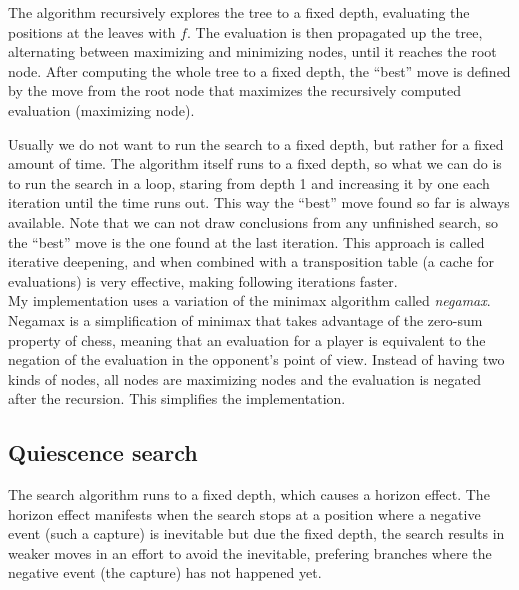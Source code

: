 The algorithm recursively explores the tree to a fixed depth, evaluating the positions at the leaves with $f$. The evaluation is then propagated up the tree, alternating between maximizing and minimizing nodes, until it reaches the root node. After computing the whole tree to a fixed depth, the \enquote{best} move is defined by the move from the root node that maximizes the recursively computed evaluation (maximizing node).

Usually we do not want to run the search to a fixed depth, but rather for a fixed amount of time. The algorithm itself runs to a fixed depth, so what we can do is to run the search in a loop, staring from depth 1 and increasing it by one each iteration until the time runs out. This way the \enquote{best} move found so far is always available. Note that we can not draw conclusions from any unfinished search, so the \enquote{best} move is the one found at the last iteration. This approach is called iterative deepening, and when combined with a transposition table (a cache for evaluations) is very effective, making following iterations faster. \\

My implementation uses a variation of the minimax algorithm called \textit{negamax}. Negamax is a simplification of minimax that takes advantage of the zero-sum property of chess, meaning that an evaluation for a player is equivalent to the negation of the evaluation in the opponent's point of view. Instead of having two kinds of nodes, all nodes are maximizing nodes and the evaluation is negated after the recursion. This simplifies the implementation.

\subsection{Quiescence search}

The search algorithm runs to a fixed depth, which causes a horizon effect. The horizon effect manifests when the search stops at a position where a negative event (such a capture) is inevitable but due the fixed depth, the search results in weaker moves in an effort to avoid the inevitable, prefering branches where the negative event (the capture) has not happened yet.

